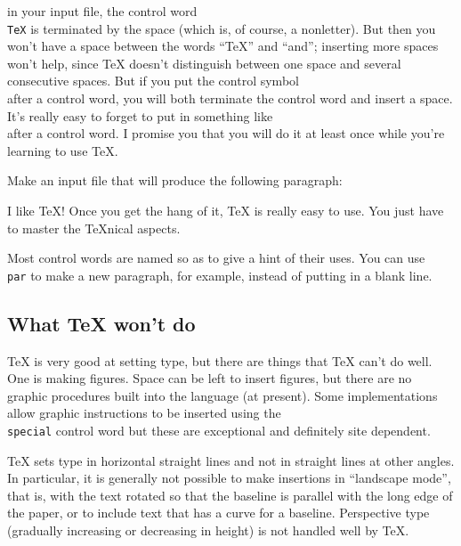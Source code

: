 
\noindent 
in your input file, the control word {\tt\\TeX} is terminated by 
the space (which is, of course, a nonletter). But then you won't 
have a space between the words ``\TeX{}'' and ``and''; inserting 
more spaces won't help, since \TeX{} doesn't distinguish between 
one space and several consecutive spaces. But if you put the 
control symbol {\tt\\\sp} after a control word, you will both 
terminate the control word and insert a space. It's really easy 
to forget to put in something like {\tt\\\sp} after a control 
word. I promise you that you will do it at least once while 
you're learning to use \TeX\null. 

\exercise Make an input file that will produce the following 
paragraph: 

I like \TeX! Once you get the hang of it, \TeX{} is really easy 
to use. You just have to master the \TeX nical aspects. 

Most control words are named so as to give a hint of their uses. 
You can use {\tt \\par} to make a new paragraph, for example, 
instead of putting in a blank line. 

\subsection{What \TeX{} won't do} 

\TeX{} is very good at setting type, but there are things that \TeX{} 
can't do well.  One is making figures.  Space can be left 
to insert figures, but there are no graphic procedures built into 
the language (at present).  Some implementations allow graphic 
instructions to be inserted using the {\tt \\special} control 
word but these are exceptional and definitely site dependent. 

\TeX{} sets type in horizontal straight lines and not in 
straight lines at other angles. In particular, it is generally 
not possible to make insertions in ``landscape mode'', that is, 
with the text rotated so that the baseline is parallel with 
the long edge of the paper, or to include text that has a curve for 
a baseline. Perspective type (gradually increasing or 
decreasing in height) is not handled well by \TeX\null. 

